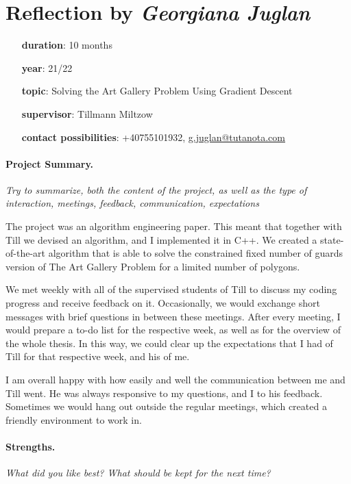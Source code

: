 \documentclass{article}
\begin{document}
\section*{Reflection by \textit{Georgiana Juglan}}



\begin{itemize}[leftmargin = 3cm, itemsep = 0cm]
    \item[\textbf{duration}:] 10 months
    \item[\textbf{year}:]  21/22
    \item[\textbf{topic}:] Solving the Art Gallery Problem Using Gradient Descent
    \item[\textbf{supervisor}:] Tillmann Miltzow
    \item[\textbf{contact possibilities}:] +40755101932, \href{mailto:g.juglan@tutanota.com}{g.juglan@tutanota.com} 
\end{itemize}



\paragraph{Project Summary.}
\textit{Try to summarize, both the content of the project, as well as the type of interaction, meetings, feedback, communication, expectations}

The project was an algorithm engineering paper. This meant that together with Till we devised an algorithm, and I implemented it in C++. 
We created a state-of-the-art algorithm that is able to solve the constrained fixed number of guards version of The Art Gallery Problem for a limited number of polygons.

We met weekly with all of the supervised students of Till to discuss my coding progress and receive feedback on it. Occasionally, we would exchange short messages with brief questions in between these meetings. After every meeting, I would prepare a to-do list for the respective week, as well as for the overview of the whole thesis. In this way, we could clear up the expectations that I had of Till for that respective week, and his of me.

I am overall happy with how easily and well the communication between me and Till went. He was always responsive to my questions, and I to his feedback. Sometimes we would hang out outside the regular meetings, which created a friendly environment to work in.




\paragraph{Strengths.}
\textit{What did you like best? What should be kept for the next time?}
\end{document}
